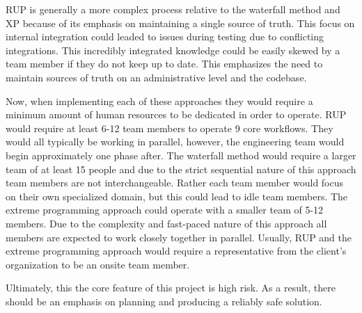\documentclass[12pt]{article}
\begin{document}
\begin{flushleft}
RUP is generally a more complex process relative to the waterfall method and XP because of its emphasis on maintaining a single source of truth. This focus on
internal integration could leaded to issues during testing due to conflicting integrations. This incredibly integrated knowledge could be easily skewed by
a team member if they do not keep up to date. This emphasizes the need to maintain sources of truth on an administrative level and the codebase. 

Now, when implementing each of these approaches they would require a minimum amount of human resources to be dedicated in order to operate. RUP would require at least
6-12 team members to operate 9 core workflows. They would all typically be working in parallel, however, the engineering team would begin approximately one phase after.
The waterfall method would require a larger team of at least 15 people and due to the strict sequential nature of this approach team members are not interchangeable. Rather
each team member would focus on their own specialized domain, but this could lead to idle team members. The extreme programming approach could operate with a smaller 
team of 5-12 members. Due to the complexity and fast-paced nature of this approach all members are expected to work closely together in parallel. Usually, RUP and the
extreme programming approach would require a representative from the client's organization to be an onsite team member.

Ultimately, this the core feature of this project is high risk. As a result, there should be an emphasis on planning and producing a reliably safe solution. 

\end{flushleft}
\end{document}
